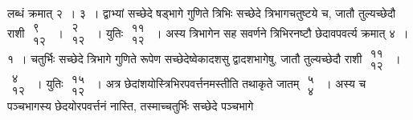\documentclass[10pt, openany]{book}
\begin{document}
{लब्धं क्रमात् २~। ३~। द्वाभ्यां सच्छेदे षड्भागे गुणिते त्रिभिः सच्छेदे
त्रिभागचतुष्टये च, जातौ}
{तुल्यच्छेदौ राशी $\begin{matrix}

\mbox{{९}}\\

\mbox{{१२}}

\end{matrix}$~। $\begin{matrix}

\mbox{{२}}\\

\mbox{{१२}}

\end{matrix}$~। युतिः $\begin{matrix}

\mbox{{११}}\\

\mbox{{१२}}

\end{matrix}$~। अस्य
त्रिभागेन सह सवर्णने त्रिभिरनष्टौ छेदावपवर्त्य}
{क्रमात् ४~। १~। चतुर्भिः सच्छेदे त्रिभागे गुणिते रूपेण
सच्छेदेष्वेकादशसु द्वादशभागेषु, जातौ}
{तुल्यच्छेदौ राशी $\begin{matrix}

\mbox{{११}}\\

\mbox{{१२}}

\end{matrix}$~। $\begin{matrix}

\mbox{{४}}\\

\mbox{{१२}}

\end{matrix}$~। युतिः $\begin{matrix}

\mbox{{१५}}\\

\mbox{{१२}}

\end{matrix}$~। अत्र
छेदांशयोस्त्रिभिरपवर्त्तनमस्तीति तथाकृते}
{जातम् $\begin{matrix}

\mbox{{५}}\\

\mbox{{४}}

\end{matrix}$~। अस्य च पञ्चभागस्य छेदयोरपवर्त्तनं नास्ति,
तस्माच्चतुर्भिः सच्छेदे पञ्चभागे}
\end{document}

